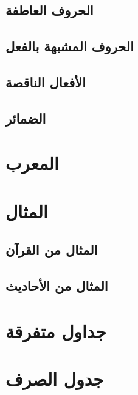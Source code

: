 \documentclass[11pt,twoside]{book}
\begin{document}
\section{الحروف العاطفة}


\section{الحروف المشبهة بالفعل}


\section{الأفعال الناقصة}

\section{الضمائر}



\chapter{المعرب}


\chapter{المثال}

\section{المثال من القرآن}


\section{المثال من الأحاديث}



\appendix


\chapter{جداول متفرقة}



\chapter{جدول الصرف}


% 

\backmatter

\printindex

\printbibheading[title={\textarabic{المصادر}}]
\printbibliography[keyword={arabic},heading=subbibliography,title={قواميس عربية}]
\printbibliography[keyword={english},heading=subbibliography,title={\hfill\textenglish{English sources}}]
\end{document}
